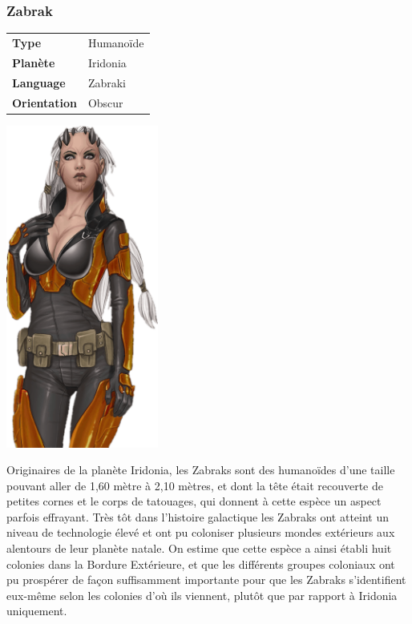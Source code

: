 \subsubsection{Zabrak}
\begin{samepage}
	\begin{flushright}
		\begin{tabular}{ l l }
			\textbf{Type} 			& Humanoïde \\
		   	\textbf{Planète} 		& Iridonia \\
		   	\textbf{Language} 		& Zabraki \\
		   	\textbf{Orientation} 	& Obscur \\
		\end{tabular}
	\end{flushright}
	\vspace{-6\baselineskip}
	\includegraphics[width=5cm]{img/races/zabrak.png}
\end{samepage}

Originaires de la planète Iridonia, les Zabraks sont des humanoïdes d'une taille pouvant aller de 1,60 mètre à 2,10 mètres, et dont la tête était recouverte de petites cornes et le corps de tatouages, qui donnent à cette espèce un aspect parfois effrayant. Très tôt dans l'histoire galactique les Zabraks ont atteint un niveau de technologie élevé et ont pu coloniser plusieurs mondes extérieurs aux alentours de leur planète natale. On estime que cette espèce a ainsi établi huit colonies dans la Bordure Extérieure, et que les différents groupes coloniaux ont pu prospérer de façon suffisamment importante pour que les Zabraks s'identifient eux-même selon les colonies d'où ils viennent, plutôt que par rapport à Iridonia uniquement.

